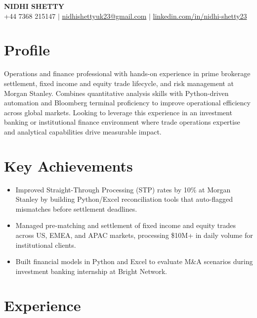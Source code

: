 \documentclass[11pt,a4paper]{article}
\begin{document}
\begin{center}
    {\LARGE\bfseries NIDHI SHETTY} \\[6pt]
    +44 7368 215147 \enspace$\vert$\enspace
    \href{mailto:nidhishettyuk23@gmail.com}{nidhishettyuk23@gmail.com} \enspace$\vert$\enspace
    \href{https://www.linkedin.com/in/nidhi-shetty23-1841b7181}{linkedin.com/in/nidhi-shetty23}
\end{center}

\section{Profile}
Operations and finance professional with hands-on experience in prime brokerage settlement, fixed income and equity trade lifecycle, and risk management at Morgan Stanley. Combines quantitative analysis skills with Python-driven automation and Bloomberg terminal proficiency to improve operational efficiency across global markets. Looking to leverage this experience in an investment banking or institutional finance environment where trade operations expertise and analytical capabilities drive measurable impact.

\section{Key Achievements}
\begin{itemize}
    \item Improved Straight-Through Processing (STP) rates by 10\% at Morgan Stanley by building Python/Excel reconciliation tools that auto-flagged mismatches before settlement deadlines.
    \item Managed pre-matching and settlement of fixed income and equity trades across US, EMEA, and APAC markets, processing \$10M+ in daily volume for institutional clients.
    \item Built financial models in Python and Excel to evaluate M\&A scenarios during investment banking internship at Bright Network.
\end{itemize}

\section{Experience}
\end{document}
